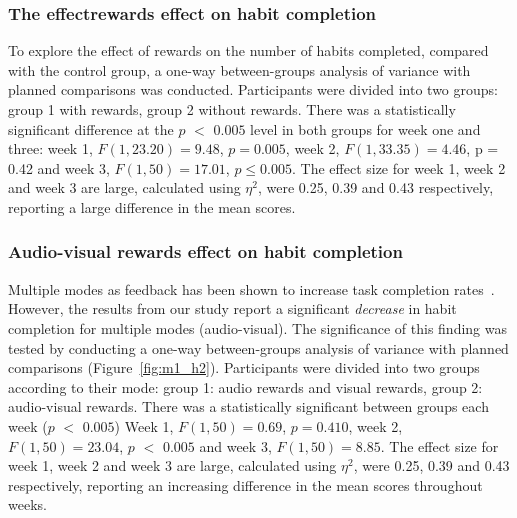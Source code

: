 \documentclass{scaffold/sigchi}
\begin{document}


\subsubsection{The effectrewards effect on habit completion}
To explore the effect of rewards on the number of habits completed, compared with the control group, a one-way between-groups analysis of variance with planned comparisons was conducted. Participants were divided into two groups: group 1 with rewards, group 2 without rewards. There was a statistically significant difference at the $p$ $<$ $0.005$ level in both groups for week one and three: week 1, $F(1,23.20) = 9.48$, $p = 0.005$, week 2, $F(1,33.35) = 4.46$, p = 0.42 and week 3, $F(1,50) = 17.01$, $p\leq 0.005$. The effect size for week 1, week 2 and week 3 are large, calculated using $\eta^{2}$, were 0.25, 0.39 and 0.43 respectively, reporting a large difference in the mean scores.

\subsubsection{Audio-visual rewards effect on habit completion}
Multiple modes as feedback has been shown to increase task completion rates~\cite{comparing_modalities_effects_of_visual_auditory, benefits_of_audio_visual_1, benefits_of_audio_visual_2}. However, the results from our study report a significant \textit{decrease} in habit completion for multiple modes (audio-visual). The significance of this finding was tested by conducting a one-way between-groups analysis of variance with planned comparisons (Figure~\ref{fig:m1_h2}). Participants were divided into two groups according to their mode: group 1: audio rewards and visual rewards, group 2: audio-visual rewards. There was a statistically significant  between groups each week ($p$ $<$ $0.005$) Week 1, $F(1,50) = 0.69$, $p = 0.410$, week 2, $F(1,50) = 23.04$, $p$ $<$ $0.005$ and week 3, $F(1,50) = 8.85$. The effect size for week 1, week 2 and week 3 are large, calculated using $\eta^{2}$, were 0.25, 0.39 and 0.43 respectively, reporting an increasing difference in the mean scores throughout weeks.
\end{document}
